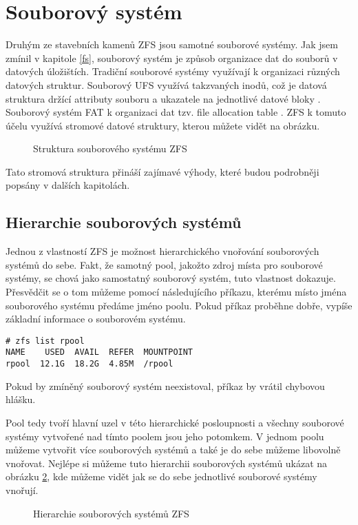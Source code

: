 \section{Souborový systém}
Druhým ze stavebních kamenů ZFS jsou samotné souborové systémy. Jak jsem zmínil v kapitole \ref{fs}, souborový systém je způsob organizace dat do souborů v datových úložištích.
Tradiční souborové systémy využívají k organizaci různých datových struktur. Souborový UFS využívá takzvaných inodů, což je datová struktura držící attributy souboru a ukazatele na jednotlivé datové bloky \cite{ufs}. Souborový systém FAT k organizaci dat tzv. file allocation table \cite{fat}. ZFS k tomuto účelu využívá stromové datové struktury, kterou můžete vidět na obrázku.
\begin{figure}[!h]
    \caption{Struktura souborového systému ZFS}
    \label{structure}
\end{figure}

Tato stromová struktura přináší zajímavé výhody, které budou podrobněji popsány v dalších kapitolách.

\subsection{Hierarchie souborových systémů}
\label{hiararchy}
Jednou z vlastností ZFS je možnost hierarchického vnořování souborových systémů do sebe. Fakt, že samotný pool, jakožto zdroj místa pro souborové systémy, se chová jako samostatný souborový systém, tuto vlastnost dokazuje. Přesvědčit se o tom můžeme pomocí následujícího příkazu, kterému místo jména souborového systému předáme jméno poolu. Pokud příkaz proběhne dobře, vypíše základní informace o souborovém systému.
\begin{verbatim}
# zfs list rpool
NAME    USED  AVAIL  REFER  MOUNTPOINT
rpool  12.1G  18.2G  4.85M  /rpool
\end{verbatim}
Pokud by zmíněný souborový systém neexistoval, příkaz by vrátil chybovou hlášku.

Pool tedy tvoří hlavní uzel v této hierarchické posloupnosti a všechny souborové systémy vytvořené nad tímto poolem jsou jeho potomkem. V jednom poolu můžeme vytvořit více souborových systémů a také je do sebe můžeme libovolně vnořovat. Nejlépe si můžeme tuto hierarchii souborových systémů ukázat na obrázku \ref{fshierarchy}, kde můžeme vidět jak se do sebe jednotlivé souborové systémy vnořují.
\begin{figure}[h]
    \caption{Hierarchie souborových systémů ZFS}
    \label{fshierarchy}
\end{figure}

